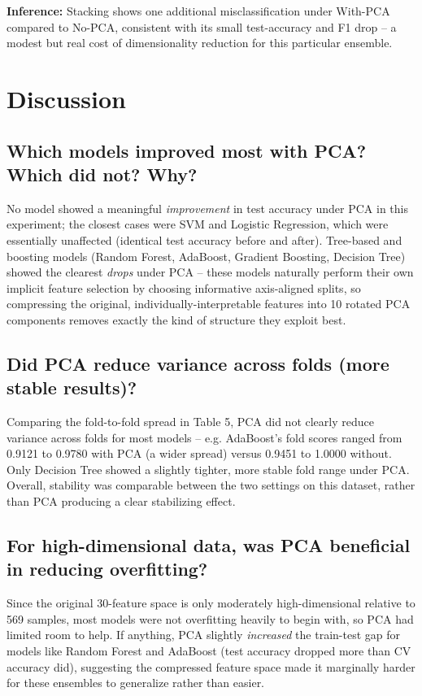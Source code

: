 \documentclass[12pt,a4paper]{article}
\begin{document}
\textbf{Inference:} Stacking shows one additional misclassification under
With-PCA compared to No-PCA, consistent with its small test-accuracy and F1 drop
-- a modest but real cost of dimensionality reduction for this particular
ensemble.

\section{Discussion}

\subsection*{Which models improved most with PCA? Which did not? Why?}
No model showed a meaningful \emph{improvement} in test accuracy under PCA in
this experiment; the closest cases were SVM and Logistic Regression, which were
essentially unaffected (identical test accuracy before and after). Tree-based and
boosting models (Random Forest, AdaBoost, Gradient Boosting, Decision Tree) showed
the clearest \emph{drops} under PCA -- these models naturally perform their own
implicit feature selection by choosing informative axis-aligned splits, so
compressing the original, individually-interpretable features into 10 rotated PCA
components removes exactly the kind of structure they exploit best.

\subsection*{Did PCA reduce variance across folds (more stable results)?}
Comparing the fold-to-fold spread in Table 5, PCA did not clearly reduce
variance across folds for most models -- e.g. AdaBoost's fold scores ranged from
0.9121 to 0.9780 with PCA (a wider spread) versus 0.9451 to 1.0000 without. Only
Decision Tree showed a slightly tighter, more stable fold range under PCA. Overall,
stability was comparable between the two settings on this dataset, rather than
PCA producing a clear stabilizing effect.

\subsection*{For high-dimensional data, was PCA beneficial in reducing overfitting?}
Since the original 30-feature space is only moderately high-dimensional relative
to 569 samples, most models were not overfitting heavily to begin with, so PCA had
limited room to help. If anything, PCA slightly \emph{increased} the train-test
gap for models like Random Forest and AdaBoost (test accuracy dropped more than
CV accuracy did), suggesting the compressed feature space made it marginally
harder for these ensembles to generalize rather than easier.
\end{document}
